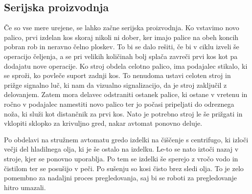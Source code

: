 \subsection{Serijska proizvodnja}
Če so vse mere urejene, se lahko začne serijska proizvodnja.
Ko vstavimo novo palico, prvi izdelan kos skoraj nikoli ni dober,
ker imajo palice na obeh koncih pobran rob in neravno čelno ploskev.
To bi se dalo rešiti, če bi v ciklu izveli še operacijo čeljenja, a se pri velikih količinah bolj splača zavreči prvi kos
kot pa dodajatu nove operacije. Ko stroj obdela celotno palico,
ima podajalec stikalo, ki se sproži, ko povleče suport zadnji
kos. To nenudoma ustavi celoten stroj in prižge signalno luč,
ki nam da vizualno signalizacijo, da je stroj zaključil z delovanjem.
Zatem mora delavec odstraniti ostanek palice, ki ostane v vretenu
in ročno v podajalec namestiti novo palico ter jo počasi pripeljati
do odreznega noža, ki služi kot distančnik za prvi kos. Nato je
potrebno stroj le še prižgati in vklopiti sklopko za krivuljno gred, nakar avtomat ponovno deluje.

Po obdelavi na stružnem avtomatu gredo izdelki na čiščenje s centrifugo,
ki izloči večji del hladilnega olja, ki je še ostalo na izdelku.
Le-to se nato iztoči nazaj v stroje, kjer se ponovno uporablja.
Po tem se izdelki še sperejo z vročo vodo in čistilom ter se posušijo
v peči. Po sušenju so kosi čisto brez sledi olja. To je zelo pomembno
za nadaljni proces pregledovanja, saj bi se roboti za pregledovanje
hitro umazali.